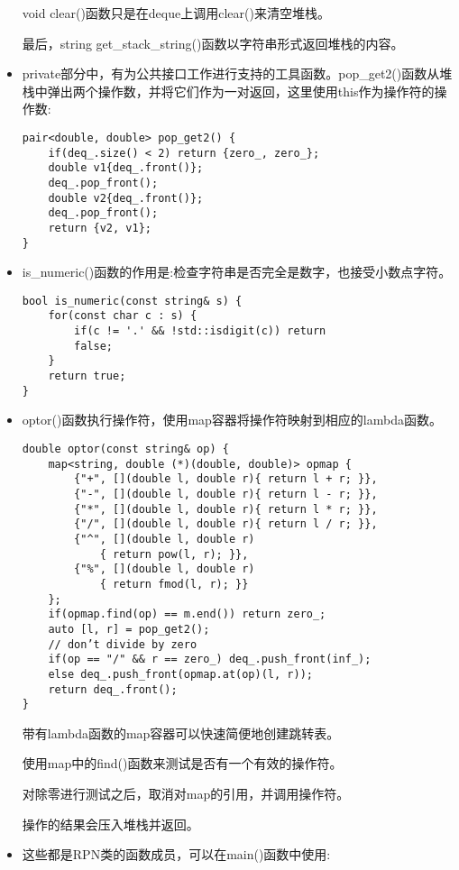 \begin{itemize}
void clear()函数只是在deque上调用clear()来清空堆栈。

最后，string get\_stack\_string()函数以字符串形式返回堆栈的内容。

\item 
private部分中，有为公共接口工作进行支持的工具函数。pop\_get2()函数从堆栈中弹出两个操作数，并将它们作为一对返回，这里使用this作为操作符的操作数:

\begin{lstlisting}[style=styleCXX]
pair<double, double> pop_get2() {
	if(deq_.size() < 2) return {zero_, zero_};
	double v1{deq_.front()};
	deq_.pop_front();
	double v2{deq_.front()};
	deq_.pop_front();
	return {v2, v1};
}
\end{lstlisting}

\item 
is\_numeric()函数的作用是:检查字符串是否完全是数字，也接受小数点字符。

\begin{lstlisting}[style=styleCXX]
bool is_numeric(const string& s) {
	for(const char c : s) {
		if(c != '.' && !std::isdigit(c)) return
		false;
	}
	return true;
}
\end{lstlisting}

\item 
optor()函数执行操作符，使用map容器将操作符映射到相应的lambda函数。

\begin{lstlisting}[style=styleCXX]
double optor(const string& op) {
	map<string, double (*)(double, double)> opmap {
		{"+", [](double l, double r){ return l + r; }},
		{"-", [](double l, double r){ return l - r; }},
		{"*", [](double l, double r){ return l * r; }},
		{"/", [](double l, double r){ return l / r; }},
		{"^", [](double l, double r)
			{ return pow(l, r); }},
		{"%", [](double l, double r)
			{ return fmod(l, r); }}
	};
	if(opmap.find(op) == m.end()) return zero_;
	auto [l, r] = pop_get2();
	// don’t divide by zero
	if(op == "/" && r == zero_) deq_.push_front(inf_);
	else deq_.push_front(opmap.at(op)(l, r));
	return deq_.front();
}
\end{lstlisting}

带有lambda函数的map容器可以快速简便地创建跳转表。

使用map中的find()函数来测试是否有一个有效的操作符。

对除零进行测试之后，取消对map的引用，并调用操作符。

操作的结果会压入堆栈并返回。

\item 
这些都是RPN类的函数成员，可以在main()函数中使用:


\end{itemize}
